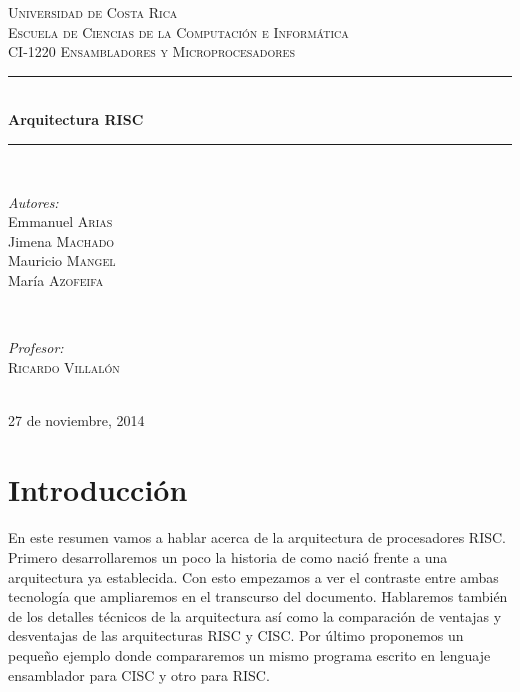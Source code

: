 \documentclass[10pt,a4paper]{article}
\begin{document}
\begin{titlepage}

\newcommand{\HRule}{\rule{\linewidth}{0.5mm}} 

\center

\textsc{\LARGE Universidad de Costa Rica}\\[1.5cm]
\textsc{\Large Escuela de Ciencias de la Computación e Informática}\\[0.5cm] 
\textsc{\large CI-1220 Ensambladores y Microprocesadores}\\[0.5cm] 

\HRule \\[0.4cm]
{ \huge \bfseries Arquitectura RISC}\\[0.4cm] %
\HRule \\[1.5cm]

\begin{minipage}{0.4\textwidth}
\begin{flushleft} \large
\emph{Autores:}\\
Emmanuel \textsc{Arias}\\ 
Jimena \textsc{Machado} \\
Mauricio \textsc{Mangel}\\
María \textsc{Azofeifa}\\
\end{flushleft}
\end{minipage}
~
\begin{minipage}{0.4\textwidth}
\begin{flushright} \large
\emph{Profesor:} \\
 \textsc{Ricardo Villalón} 
\end{flushright}
\end{minipage}\\[4cm]

{\large 27 de noviembre, 2014}\\[3cm] 

\vfill 

\end{titlepage}
\section*{Introducción}
\paragraph{}
En este resumen vamos a hablar acerca de la arquitectura de procesadores RISC. Primero desarrollaremos un poco la historia de como nació frente a una arquitectura ya establecida. Con esto empezamos a ver el contraste entre ambas tecnología que ampliaremos en el transcurso del documento. Hablaremos también de los detalles técnicos de la arquitectura así como la comparación de ventajas y desventajas de las arquitecturas RISC y CISC. Por último proponemos un pequeño ejemplo donde compararemos un mismo programa escrito en lenguaje ensamblador para CISC y otro para RISC.
\end{document}
